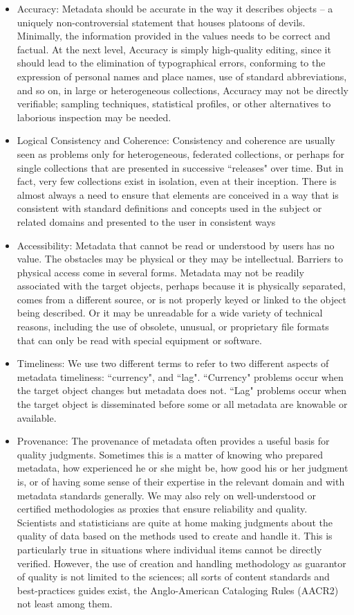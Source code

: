 \documentclass[epsfig,a4paper,12pt,titlepage]{book}
\begin{document}
\begin{itemize}
\item Accuracy: Metadata should be accurate in the way it describes objects -- a uniquely non-controversial statement that houses platoons of devils. Minimally, the information provided in the values needs to be correct and factual. At the next level, Accuracy is simply high-quality editing, since it should lead to the elimination of typographical errors, conforming to the expression of personal names and place names, use of standard abbreviations, and so on, in large or heterogeneous collections, Accuracy may not be directly verifiable; sampling techniques, statistical profiles, or other alternatives to laborious inspection may be needed.
\item Logical Consistency and Coherence: Consistency and coherence are usually seen as problems only for heterogeneous, federated collections, or perhaps for single collections that are presented in successive ``releases" over time. But in fact, very few collections exist in isolation, even at their inception. There is almost always a need to ensure that elements are conceived in a way that is consistent with standard definitions and concepts used in the subject or related domains and presented to the user in consistent ways
\item Accessibility: Metadata that cannot be read or understood by users has no value. The obstacles may be physical or they may be intellectual. Barriers to physical access come in several forms.  Metadata may not be readily associated with the target objects, perhaps because it is physically separated, comes from a different source, or is not properly keyed or linked to the object being described. Or it may be unreadable for a wide variety of technical reasons, including the use of obsolete, unusual, or proprietary file formats that can only be read with special equipment or software. 
\item Timeliness: We use two different terms to refer to two different aspects of metadata timeliness: ``currency", and ``lag".  ``Currency" problems occur when the target object changes but metadata does not. ``Lag" problems occur when the target object is disseminated before some or all metadata are knowable or available.
\item Provenance: The provenance of metadata often provides a useful basis for quality judgments. Sometimes this is a matter of knowing who prepared metadata, how experienced he or she might be, how good his or her judgment is, or of having some sense of their expertise in the relevant domain and with metadata standards generally. We may also rely on well-understood or certified methodologies as proxies that ensure reliability and quality. Scientists and statisticians are quite at home making judgments about the quality of data based on the methods used to create and handle it.  This is particularly true in situations where individual items cannot be directly verified. However, the use of creation and handling methodology as guarantor of quality is not limited to the sciences; all sorts of content standards and best-practices guides exist, the Anglo-American Cataloging Rules (AACR2) not least among them.

\end{itemize}
\end{document}
